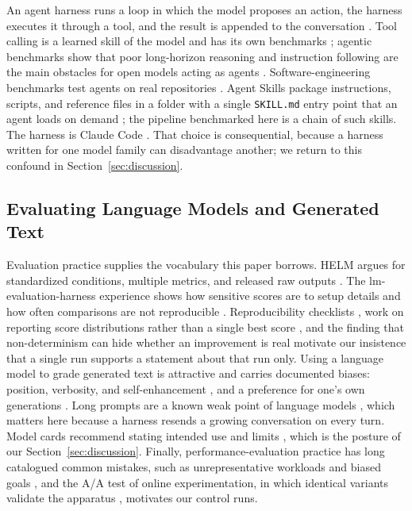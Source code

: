 An agent harness runs a loop in which the model proposes an action, the harness executes it through a tool, and the result is appended to the conversation \cite{yao2023react, anthropic2024agents}. Tool calling is a learned skill of the model and has its own benchmarks \cite{patil2023gorilla, patil2025bfcl}; agentic benchmarks show that poor long-horizon reasoning and instruction following are the main obstacles for open models acting as agents \cite{liu2023agentbench}. Software-engineering benchmarks test agents on real repositories \cite{jimenez2024swebench}. Agent Skills package instructions, scripts, and reference files in a folder with a single \texttt{SKILL.md} entry point that an agent loads on demand \cite{anthropic2025skills}; the pipeline benchmarked here is a chain of such skills. The harness is Claude Code \cite{claudecode}. That choice is consequential, because a harness written for one model family can disadvantage another; we return to this confound in Section~\ref{sec:discussion}.

\subsection{Evaluating Language Models and Generated Text}

Evaluation practice supplies the vocabulary this paper borrows. HELM argues for standardized conditions, multiple metrics, and released raw outputs \cite{liang2022helm}. The lm-evaluation-harness experience shows how sensitive scores are to setup details and how often comparisons are not reproducible \cite{biderman2024lessons}. Reproducibility checklists \cite{pineau2021reproducibility}, work on reporting score distributions rather than a single best score \cite{dodge2019show}, and the finding that non-determinism can hide whether an improvement is real \cite{henderson2018rl} motivate our insistence that a single run supports a statement about that run only. Using a language model to grade generated text is attractive and carries documented biases: position, verbosity, and self-enhancement \cite{zheng2023judge}, and a preference for one's own generations \cite{panickssery2024selfpref}. Long prompts are a known weak point of language models \cite{liu2024lost, hsieh2024ruler}, which matters here because a harness resends a growing conversation on every turn. Model cards recommend stating intended use and limits \cite{mitchell2019modelcards}, which is the posture of our Section~\ref{sec:discussion}. Finally, performance-evaluation practice has long catalogued common mistakes, such as unrepresentative workloads and biased goals \cite{jain1991art}, and the A/A test of online experimentation, in which identical variants validate the apparatus \cite{kohavi2020trustworthy}, motivates our control runs.

